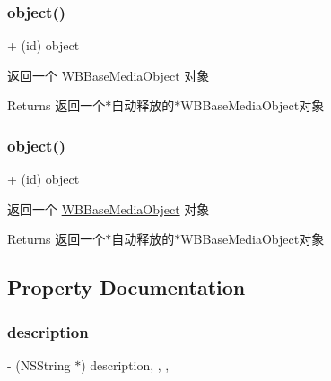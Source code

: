 \subsubsection{\texorpdfstring{object()}{object()}\hspace{0.1cm}{\footnotesize\ttfamily [2/3]}}
{\footnotesize\ttfamily + (id) object \begin{DoxyParamCaption}{ }\end{DoxyParamCaption}}

返回一个 \mbox{\hyperlink{interface_w_b_base_media_object}{W\+B\+Base\+Media\+Object}} 对象

\begin{DoxyReturn}{Returns}
返回一个$\ast$自动释放的$\ast$\+W\+B\+Base\+Media\+Object对象 
\end{DoxyReturn}
\mbox{\label{interface_w_b_base_media_object_ab2df3d8d124732859fa7ebf5b9f3362f}} 
\subsubsection{\texorpdfstring{object()}{object()}\hspace{0.1cm}{\footnotesize\ttfamily [3/3]}}
{\footnotesize\ttfamily + (id) object \begin{DoxyParamCaption}{ }\end{DoxyParamCaption}}

返回一个 \mbox{\hyperlink{interface_w_b_base_media_object}{W\+B\+Base\+Media\+Object}} 对象

\begin{DoxyReturn}{Returns}
返回一个$\ast$自动释放的$\ast$\+W\+B\+Base\+Media\+Object对象 
\end{DoxyReturn}


\subsection{Property Documentation}
\mbox{\label{interface_w_b_base_media_object_aa4bc7a295712e9f7c0ff0eb3188019fe}} 
\subsubsection{\texorpdfstring{description}{description}}
{\footnotesize\ttfamily -\/ (N\+S\+String $\ast$) description\hspace{0.3cm}{\ttfamily [read]}, {\ttfamily [write]}, {\ttfamily [nonatomic]}, {\ttfamily [strong]}}

